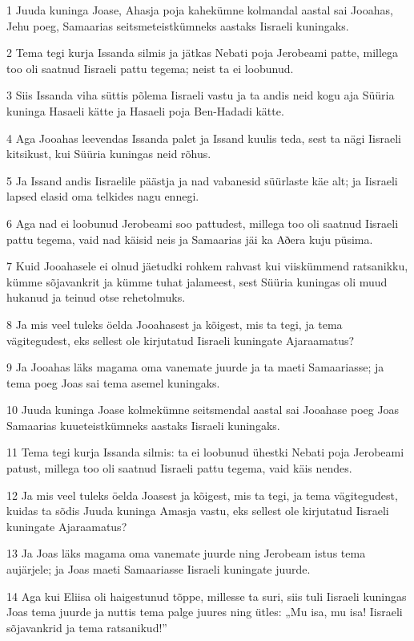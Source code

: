 \par 1 Juuda kuninga Joase, Ahasja poja kahekümne kolmandal aastal sai Jooahas, Jehu poeg, Samaarias seitsmeteistkümneks aastaks Iisraeli kuningaks.
\par 2 Tema tegi kurja Issanda silmis ja jätkas Nebati poja Jerobeami patte, millega too oli saatnud Iisraeli pattu tegema; neist ta ei loobunud.
\par 3 Siis Issanda viha süttis põlema Iisraeli vastu ja ta andis neid kogu aja Süüria kuninga Hasaeli kätte ja Hasaeli poja Ben-Hadadi kätte.
\par 4 Aga Jooahas leevendas Issanda palet ja Issand kuulis teda, sest ta nägi Iisraeli kitsikust, kui Süüria kuningas neid rõhus.
\par 5 Ja Issand andis Iisraelile päästja ja nad vabanesid süürlaste käe alt; ja Iisraeli lapsed elasid oma telkides nagu ennegi.
\par 6 Aga nad ei loobunud Jerobeami soo pattudest, millega too oli saatnud Iisraeli pattu tegema, vaid nad käisid neis ja Samaarias jäi ka Aðera kuju püsima.
\par 7 Kuid Jooahasele ei olnud jäetudki rohkem rahvast kui viiskümmend ratsanikku, kümme sõjavankrit ja kümme tuhat jalameest, sest Süüria kuningas oli muud hukanud ja teinud otse rehetolmuks.
\par 8 Ja mis veel tuleks öelda Jooahasest ja kõigest, mis ta tegi, ja tema vägitegudest, eks sellest ole kirjutatud Iisraeli kuningate Ajaraamatus?
\par 9 Ja Jooahas läks magama oma vanemate juurde ja ta maeti Samaariasse; ja tema poeg Joas sai tema asemel kuningaks.
\par 10 Juuda kuninga Joase kolmekümne seitsmendal aastal sai Jooahase poeg Joas Samaarias kuueteistkümneks aastaks Iisraeli kuningaks.
\par 11 Tema tegi kurja Issanda silmis: ta ei loobunud ühestki Nebati poja Jerobeami patust, millega too oli saatnud Iisraeli pattu tegema, vaid käis nendes.
\par 12 Ja mis veel tuleks öelda Joasest ja kõigest, mis ta tegi, ja tema vägitegudest, kuidas ta sõdis Juuda kuninga Amasja vastu, eks sellest ole kirjutatud Iisraeli kuningate Ajaraamatus?
\par 13 Ja Joas läks magama oma vanemate juurde ning Jerobeam istus tema aujärjele; ja Joas maeti Samaariasse Iisraeli kuningate juurde.
\par 14 Aga kui Eliisa oli haigestunud tõppe, millesse ta suri, siis tuli Iisraeli kuningas Joas tema juurde ja nuttis tema palge juures ning ütles: „Mu isa, mu isa! Iisraeli sõjavankrid ja tema ratsanikud!”
